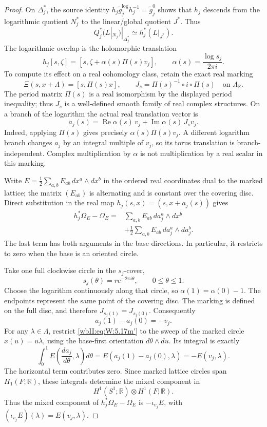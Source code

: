 \begin{proof}
On $\Delta_j^*$, the source identity
$h_j\widetilde g_j^{\log}h_j^{-1}=\widetilde g_j^0$ shows that $h_j$
descends from the logarithmic quotient $N_j^*$ to the linear/global
quotient $J^*$.  Thus
\[
 Q_j^*(L|_{N_j})|_{\Delta_j^*}
 \simeq h_j^*(L|_{J^*}).
\tag{W.32}\label{wbII:eq:W:5.17l'''}
\]
The logarithmic overlap is the holomorphic translation
\[
 h_j[s,\zeta]=[s,\zeta+\alpha(s)\Pi(s)v_j],
 \qquad \alpha(s)=\frac{\log s_j}{2\pi i}.
\]
To compute its effect on a real cohomology class, retain the exact
real marking
\[
 \Xi(s,x+\Lambda)=[s,\Pi(s)x],\qquad
 J_s=\Pi(s)^{-1}\circ i\circ\Pi(s)
 \quad\text{on }\Lambda_{\mathbb R}.
\]
The period matrix \(\Pi(s)\) is a real isomorphism by the displayed period inequality;
thus \(J_s\) is a well-defined smooth family of real complex
structures.  On a branch of the logarithm the actual real
translation vector is
\[
 a_j(s)=\operatorname{Re}\alpha(s)\,v_j+
        \operatorname{Im}\alpha(s)\,J_s v_j.
 \tag{W.33}\label{wbII:eq:W:5.17m}
\]
Indeed, applying \(\Pi(s)\) gives precisely
\(\alpha(s)\Pi(s)v_j\).  A different logarithm branch changes
\(a_j\) by an integral multiple of \(v_j\), so its torus translation
is branch-independent.  Complex multiplication by \(\alpha\) is
not multiplication by a real scalar in this marking.

Write \(E=\frac12\sum_{a,b}E_{ab}\,dx^a\wedge dx^b\) in the
ordered real coordinates dual to the marked lattice; the matrix
\((E_{ab})\) is alternating and is constant over the covering
disc.  Direct substitution in the real map
\(h_j(s,x)=(s,x+a_j(s))\) gives
\[
 \begin{split}
 h_j^*\Omega_E-\Omega_E
  ={}&\sum_{a,b}E_{ab}\,d a_j^a\wedge dx^b\\
    &+\frac12\sum_{a,b}E_{ab}\,d a_j^a\wedge d a_j^b.
 \end{split}
 \tag{W.34}\label{wbII:eq:W:5.17m'}
\]
The last term has both arguments in the base directions.
In particular, it restricts to zero when the base is an oriented
circle.

Take one full clockwise circle in the \(s_j\)-cover,
\[
 s_j(\theta)=r e^{-2\pi i\theta},\qquad 0\le\theta\le1.
\]
Choose the logarithm continuously along that circle, so
\(\alpha(1)=\alpha(0)-1\).  The endpoints represent the same
point of the covering disc.  The marking is defined on the full
disc, and therefore \(J_{s_j(1)}=J_{s_j(0)}\).  Consequently
\[
 a_j(1)-a_j(0)=-v_j.
 \tag{W.35}\label{wbII:eq:W:5.17m''}
\]
For any \(\lambda\in\Lambda\), restrict \eqref{wbII:eq:W:5.17m'} to the sweep of
the marked circle \(x(u)=u\lambda\), using the base-first
orientation \(d\theta\wedge du\).  Its integral is exactly
\[
 \int_0^1 E\!\left(\frac{d a_j}{d\theta},\lambda\right)d\theta
 =E(a_j(1)-a_j(0),\lambda)
 =-E(v_j,\lambda).
\]
The horizontal term contributes zero.  Since marked lattice
circles span \(H_1(F;\mathbb R)\), these integrals determine the
mixed component in
\[
 H^1(S^1;\mathbb R)\otimes H^1(F;\mathbb R).
\]
Thus the mixed component of \(h_j^*\Omega_E-\Omega_E\) is
\(-\iota_{v_j}E\), with \((\iota_{v_j}E)(\lambda)=E(v_j,\lambda)\).


\end{proof}
